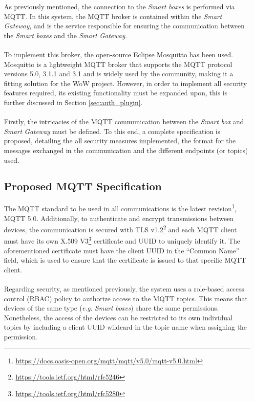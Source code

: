 As previously mentioned, the connection to the \textit{Smart boxes} is performed via \acs{MQTT}. In this system, the \acs{MQTT} broker is contained within the \textit{Smart Gateway}, and is the service responsible for ensuring the communication between the \textit{Smart boxes} and the \textit{Smart Gateway}.

\paragraph{} To implement this broker, the open-source Eclipse Mosquitto \cite{mosquitto} has been used. Mosquitto is a lightweight \acs{MQTT} broker that supports the \acs{MQTT} protocol versions 5.0, 3.1.1 and 3.1 and is widely used by the community, making it a fitting solution for the \acs{WoW} project. However, in order to implement all security features required, its existing functionality must be expanded upon, this is further discussed in Section \ref{sec:auth_plugin}.

\paragraph{} Firstly, the intricacies of the \acs{MQTT} communication between the \textit{Smart box} and \textit{Smart Gateway} must be defined. To this end, a complete specification is proposed, detailing the all security measures implemented, the format for the messages exchanged in the communication and the different endpoints (or topics) used. 

\subsection{Proposed \acs{MQTT} Specification}

The \acs{MQTT} standard to be used in all communications is the latest revision\footnote{\url{https://docs.oasis-open.org/mqtt/mqtt/v5.0/mqtt-v5.0.html}}, MQTT 5.0. Additionally, to authenticate and encrypt transmissions between devices, the communication is secured with \acs{TLS} v1.2\footnote{\url{https://tools.ietf.org/html/rfc5246}} and each \acs{MQTT} client must have its own X.509 V3\footnote{\url{https://tools.ietf.org/html/rfc5280}} certificate and \acs{UUID} to uniquely identify it. 
The aforementioned certificate must have the client \acs{UUID} in the ``Common Name'' field, which is used to ensure that the certificate is issued to that specific \acs{MQTT} client.

\paragraph{} Regarding security, as mentioned previously, the system uses a role-based access control (\acs{RBAC}) policy to authorize access to the \acs{MQTT} topics. This means that devices of the same type (\textit{e.g.} \textit{Smart boxes}) share the same permissions. 
Nonetheless, the access of the devices can be restricted to its own individual topics by including a client \acs{UUID} wildcard in the topic name when assigning the permission.

